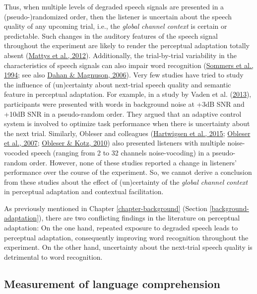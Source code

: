 \documentclass[a4paper, nobind]{templates/ociamthesis}
\begin{document}
Thus, when multiple levels of degraded speech signals are presented in a (pseudo-)randomized order, then the listener is uncertain about the speech quality of any upcoming trial, i.e., the \emph{global channel context} is certain or predictable.
Such changes in the auditory features of the speech signal throughout the experiment are likely to render the perceptual adaptation totally absent (\protect\hyperlink{ref-Mattys2012}{Mattys et al., 2012}).
Additionally, the trial-by-trial variability in the characteristics of speech signals can also impair word recognition (\protect\hyperlink{ref-Sommers1994}{Sommers et al., 1994}; see also \protect\hyperlink{ref-Dahan2006}{Dahan \& Magnuson, 2006}).
Very few studies have tried to study the influence of (un)certainty about next-trial speech quality and semantic feature in perceptual adaptation.
For example, in a study by Vaden et al. (\protect\hyperlink{ref-Vaden2013}{2013}), participants were presented with words in background noise at +3dB SNR and +10dB SNR in a pseudo-random order.
They argued that an adaptive control system is involved to optimize task performance when there is uncertainty about the next trial.
Similarly, Obleser and colleagues (\protect\hyperlink{ref-Hartwigsen2015}{Hartwigsen et al., 2015}; \protect\hyperlink{ref-Obleser2007}{Obleser et al., 2007}; \protect\hyperlink{ref-Obleser2010}{Obleser \& Kotz, 2010}) also presented listeners with multiple noise-vocoded speech (ranging from 2 to 32 channels noise-vocoding) in a pseudo-random order.
However, none of these studies reported a change in listeners' performance over the course of the experiment.
So, we cannot derive a conclusion from these studies about the effect of (un)certainty of the \emph{global channel context} in perceptual adaptation and contextual facilitation.

As previously mentioned in Chapter \ref{chapter-background} (Section \ref{background-adaptation}), there are two conflicting findings in the literature on perceptual adaptation:
On the one hand, repeated exposure to degraded speech leads to perceptual adaptation, consequently improving word recognition throughout the experiment.
On the other hand, uncertainty about the next-trial speech quality is detrimental to word recognition.

\hypertarget{chapter-6-measurement}{%
\subsection{Measurement of language comprehension}\label{chapter-6-measurement}}
\end{document}
